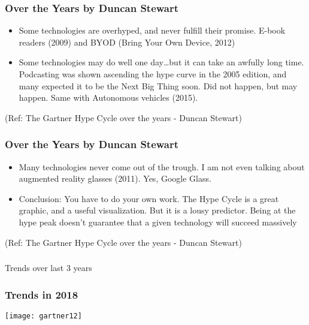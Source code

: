 \begin{frame}[fragile]\frametitle{Over the Years by Duncan Stewart}


\begin{itemize}
\item Some technologies are overhyped, and never fulfill their promise. E-book readers (2009) and BYOD (Bring Your Own Device, 2012)

\item Some technologies may do well one day…but it can take an awfully long time. Podcasting was shown ascending the hype curve in the 2005 edition, and many expected it to be the Next Big Thing soon. Did not happen, but may happen. Same with Autonomous vehicles (2015).
\end{itemize}

{\tiny (Ref: The Gartner Hype Cycle over the years - Duncan Stewart)}


\end{frame}

\begin{frame}[fragile]\frametitle{Over the Years by Duncan Stewart}


\begin{itemize}
\item Many technologies never come out of the trough. I am not even talking about augmented reality glasses (2011). Yes, Google Glass.

\item Conclusion: You have to do your own work. The Hype Cycle is a great graphic, and a useful visualization. But it is a lousy predictor. Being at the hype peak doesn’t guarantee that a given technology will succeed massively
\end{itemize}

{\tiny (Ref: The Gartner Hype Cycle over the years - Duncan Stewart)}


\end{frame}

\begin{frame}[fragile]\frametitle{}
\begin{center}
{\Large Trends over last 3 years}
\end{center}
\end{frame}


\begin{frame}[fragile]\frametitle{Trends in 2018}

\begin{center}
\texttt{[image: gartner12]}
\end{center}


\end{frame}

